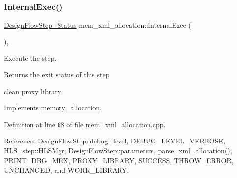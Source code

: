 \mbox{\label{classmem__xml__allocation_ab52f147c4c950b89428a1c6ad515a7a3}} 
\subsubsection{\texorpdfstring{Internal\+Exec()}{InternalExec()}}
{\footnotesize\ttfamily \hyperlink{design__flow__step_8hpp_afb1f0d73069c26076b8d31dbc8ebecdf}{Design\+Flow\+Step\+\_\+\+Status} mem\+\_\+xml\+\_\+allocation\+::\+Internal\+Exec (\begin{DoxyParamCaption}{ }\end{DoxyParamCaption})\hspace{0.3cm}{\ttfamily [override]}, {\ttfamily [virtual]}}



Execute the step. 

\begin{DoxyReturn}{Returns}
the exit status of this step 
\end{DoxyReturn}
clean proxy library 

Implements \hyperlink{classmemory__allocation_a7d2e79df1dbef9bc6682ca310eb408d5}{memory\+\_\+allocation}.



Definition at line 68 of file mem\+\_\+xml\+\_\+allocation.\+cpp.



References Design\+Flow\+Step\+::debug\+\_\+level, D\+E\+B\+U\+G\+\_\+\+L\+E\+V\+E\+L\+\_\+\+V\+E\+R\+B\+O\+SE, H\+L\+S\+\_\+step\+::\+H\+L\+S\+Mgr, Design\+Flow\+Step\+::parameters, parse\+\_\+xml\+\_\+allocation(), P\+R\+I\+N\+T\+\_\+\+D\+B\+G\+\_\+\+M\+EX, P\+R\+O\+X\+Y\+\_\+\+L\+I\+B\+R\+A\+RY, S\+U\+C\+C\+E\+SS, T\+H\+R\+O\+W\+\_\+\+E\+R\+R\+OR, U\+N\+C\+H\+A\+N\+G\+ED, and W\+O\+R\+K\+\_\+\+L\+I\+B\+R\+A\+RY.

